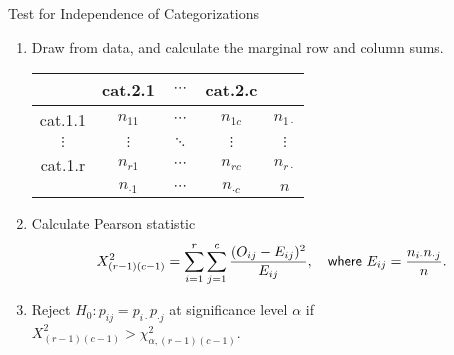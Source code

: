 \begin{frame}{Test for Independence of Categorizations}

\begin{enumerate}
	\justifying
	\item Draw  from data, and calculate the marginal row and column sums.
	\begin{table}
		\footnotesize
		\centering
		\begin{tabular}{c|ccc|c}
			 & cat.2.1 & $\cdots$ & cat.2.c & \\
			\hline
			cat.1.1 & $n_{11}$ & $\cdots$ & $n_{1c}$ & $n_{1\cdot}$ \\
			$\vdots$ & $\vdots$ & $\ddots$ & $\vdots$ & $\vdots$ \\
			cat.1.r & $n_{r1}$ & $\cdots$ & $n_{rc}$ & $n_{r\cdot}$ \\
			\hline
			& $n_{\cdot 1}$ & $\cdots$ & $n_{\cdot c}$ & $n$
		\end{tabular}
	\end{table}
	\item Calculate Pearson statistic
	\footnotesize
	\begin{align*}
	X^2_{(r-1)(c-1)} = \sum_{i=1}^r \sum_{j=1}^c \frac{(O_{ij}-E_{ij})^2}{E_{ij}}, \quad \mathsf{where\ } E_{ij} = \frac{n_{i\cdot}n_{\cdot j}}{n}.
	\end{align*}
	\normalsize
	\item Reject $H_0: p_{ij} = p_{i\cdot}p_{\cdot j}$ at significance level $\alpha$ if $X^2_{(r-1)(c-1)} > \chi_{\alpha,(r-1)(c-1)}^2$.
\end{enumerate}

\end{frame}


